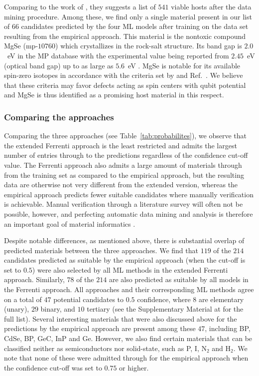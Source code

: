 \documentclass[superscriptaddress,unsortedaddress,
 amsmath,amssymb,
 aps,
]{revtex4-2}
\begin{document}
Comparing to the work of \citeauthor{Ferrenti2020} \cite{Ferrenti2020}, they suggests a list of $541$ viable hosts after the data mining procedure.  
Among these, we find only a single material present in our list of $66$ candidates predicted by the four ML models after training on the data set resulting from the empirical approach. This material is the nontoxic compound MgSe (mp-$10760$) which crystallizes in the rock-salt structure. Its band gap is $2.0$~eV in the MP database with the experimental value being reported from $2.45$~eV (optical band gap) \cite{Ubale2014} up to as large as $5.6$~eV \cite{SaumGeorge1959}. MgSe is notable for its available spin-zero isotopes in accordance with the criteria set by  \citeauthor{Weber2010} \cite{Weber2010} and \citeauthor{Ferrenti2020} Ref.~\cite{Ferrenti2020}. We believe that these criteria may favor defects acting as spin centers with qubit potential and MgSe is thus identified as a promising host material in this respect.   

\subsubsection*{Comparing the approaches}
Comparing the three approaches (see Table~\ref{tab:probabilites}), we observe  that the extended Ferrenti approach is the least restricted and admits the largest number of entries through to the predictions regardless of the confidence cut-off value. The Ferrenti approach also admits a large amount of materials through from the training set as compared to the empirical approach, but the resulting data are otherwise not very different from the extended version, whereas the empirical approach predicts fewer suitable candidates where manually verification is achievable. Manual verification through a literature survey will often not be possible, however, and perfecting automatic data mining and analysis is therefore an important goal of material informatics \cite{rickman2019}. 

Despite notable differences, as mentioned above, there is substantial overlap of predicted materials between the three approaches. 
We find that $119$ of the $214$ candidates predicted as suitable by the empirical approach (when the cut-off is set to $0.5$) were also selected by all ML methods in the extended Ferrenti approach. 
Similarly, $78$ of the $214$ are also predicted as suitable by all models in the Ferrenti approach. All approaches and their corresponding ML methods agree on a total of $47$ potential candidates to $0.5$ confidence, where $8$ are elementary (unary), $29$ binary, and $10$ tertiary 
(see the Supplementary Material at \cite{supplementary} for the full list). 
Several interesting materials that were also discussed above for the predictions by the empirical approach are present among these $47$, including BP, CdSe, BP, GeC, InP and Ge. However, we also find certain materials that can be classified neither as semiconductors nor solid-state, such as P, I, N$_2$ and H$_2$. We note that none of these were admitted through for the empirical approach when the confidence cut-off was set to $0.75$ or higher.
\end{document}
